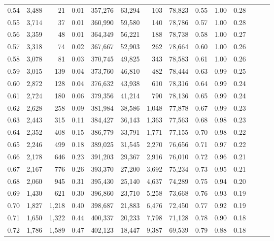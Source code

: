 \begin{tabular}{rrrrrrrrrrrrrr}
0.54 &  3,488 &     21 &  0.01 &  357,276 &   63,294 &     103 &  78,823 &  0.55 &  1.00 &      0.28 \\
0.55 &  3,714 &     37 &  0.01 &  360,990 &   59,580 &     140 &  78,786 &  0.57 &  1.00 &      0.28 \\
0.56 &  3,359 &     48 &  0.01 &  364,349 &   56,221 &     188 &  78,738 &  0.58 &  1.00 &      0.27 \\
0.57 &  3,318 &     74 &  0.02 &  367,667 &   52,903 &     262 &  78,664 &  0.60 &  1.00 &      0.26 \\
0.58 &  3,078 &     81 &  0.03 &  370,745 &   49,825 &     343 &  78,583 &  0.61 &  1.00 &      0.26 \\
0.59 &  3,015 &    139 &  0.04 &  373,760 &   46,810 &     482 &  78,444 &  0.63 &  0.99 &      0.25 \\
0.60 &  2,872 &    128 &  0.04 &  376,632 &   43,938 &     610 &  78,316 &  0.64 &  0.99 &      0.24 \\
0.61 &  2,724 &    180 &  0.06 &  379,356 &   41,214 &     790 &  78,136 &  0.65 &  0.99 &      0.24 \\
0.62 &  2,628 &    258 &  0.09 &  381,984 &   38,586 &   1,048 &  77,878 &  0.67 &  0.99 &      0.23 \\
0.63 &  2,443 &    315 &  0.11 &  384,427 &   36,143 &   1,363 &  77,563 &  0.68 &  0.98 &      0.23 \\
0.64 &  2,352 &    408 &  0.15 &  386,779 &   33,791 &   1,771 &  77,155 &  0.70 &  0.98 &      0.22 \\
0.65 &  2,246 &    499 &  0.18 &  389,025 &   31,545 &   2,270 &  76,656 &  0.71 &  0.97 &      0.22 \\
0.66 &  2,178 &    646 &  0.23 &  391,203 &   29,367 &   2,916 &  76,010 &  0.72 &  0.96 &      0.21 \\
0.67 &  2,167 &    776 &  0.26 &  393,370 &   27,200 &   3,692 &  75,234 &  0.73 &  0.95 &      0.21 \\
0.68 &  2,060 &    945 &  0.31 &  395,430 &   25,140 &   4,637 &  74,289 &  0.75 &  0.94 &      0.20 \\
0.69 &  1,430 &    621 &  0.30 &  396,860 &   23,710 &   5,258 &  73,668 &  0.76 &  0.93 &      0.19 \\
0.70 &  1,827 &  1,218 &  0.40 &  398,687 &   21,883 &   6,476 &  72,450 &  0.77 &  0.92 &      0.19 \\
0.71 &  1,650 &  1,322 &  0.44 &  400,337 &   20,233 &   7,798 &  71,128 &  0.78 &  0.90 &      0.18 \\
0.72 &  1,786 &  1,589 &  0.47 &  402,123 &   18,447 &   9,387 &  69,539 &  0.79 &  0.88 &      0.18 \\

\end{tabular}
